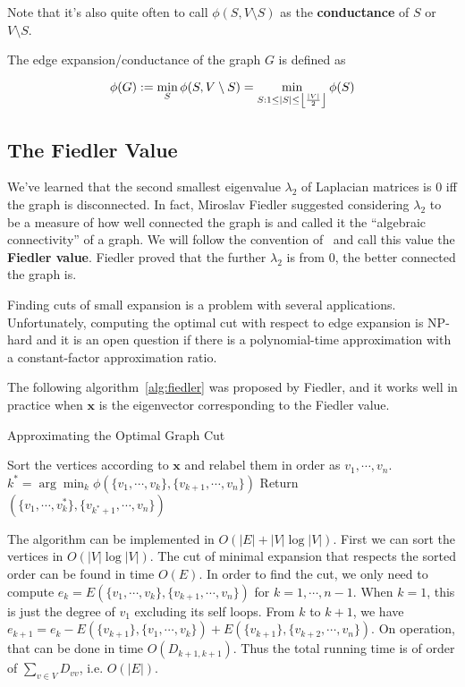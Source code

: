 \documentclass[a4paper]{article}
\DeclarePairedDelimiter\floor{\lfloor}{\rfloor}
\theoremstyle{definition}
\begin{document}
Note that it's also quite often to call $\phi(S, V\setminus S)$ as the \textbf{conductance} of $S$ or $V\setminus S$.

The edge expansion/conductance of the graph $G$ is defined as

\begin{equation}
    \phi(G) := \min_{S}\phi(S, V\setminus S) = \min_{S:1\leq |S|\leq \floor*{\frac{|V|}{2}}}\phi(S)
\end{equation}

\subsection{The Fiedler Value}

We've learned that the second smallest eigenvalue $\lambda_2$ of Laplacian matrices is $0$ iff the graph is disconnected. In fact, Miroslav Fiedler suggested considering $\lambda_2$ to be a measure of how well connected the graph is and called it the ``algebraic connectivity'' of a graph. We will follow the convention of~\cite{Spielman_notes_2018} and call this value the \textbf{Fiedler value}. Fiedler proved that the further $\lambda_2$ is from $0$, the better connected the graph is.

Finding cuts of small expansion is a problem with several applications. Unfortunately, computing the optimal cut with respect to edge expansion is NP-hard and it is an open question if there is a polynomial-time approximation with a constant-factor approximation ratio.

The following algorithm~\ref{alg:fiedler} was proposed by Fiedler, and it works well in practice when $\textbf{x}$ is the eigenvector corresponding to the Fiedler value.

\begin{algorithm}
\caption{Approximating the Optimal Graph Cut}
\begin{algorithmic}[1]

\State Sort the vertices according to $\textbf{x}$ and relabel them in order as $v_1,\cdots, v_n$.
\State $k^{\ast}=\arg\min_{k}\phi(\{v_1,\cdots, v_k\},\{v_{k+1},\cdots, v_n\})$
\State Return $(\{v_1,\cdots, v_k^{\ast}\},\{v_{k^{\ast}+1},\cdots, v_n\})$
\end{algorithmic}
\label{alg:fiedler}
\end{algorithm}

The algorithm can be implemented in $O(|E|+|V|\log |V|)$. First we can sort the vertices in $O(|V|\log |V|)$. The cut of minimal expansion that respects the sorted order can be found in time $O(E)$. In order to find the cut, we only need to compute $e_k=E(\{v_1,\cdots, v_k\},\{v_{k+1},\cdots, v_n\})$ for $k=1,\cdots, n-1$. When $k=1$, this is just the degree of $v_1$ excluding its self loops. From $k$ to $k+1$, we have $e_{k+1}=e_{k}-E(\{v_{k+1}\},\{v_1,\cdots, v_k\}) + E(\{v_{k+1}\},\{v_{k+2},\cdots, v_{n}\})$. On operation, that can be done in time $O(D_{k+1,k+1})$. Thus the total running time is of order of $\sum_{v\in V}D_{vv}$, i.e. $O(|E|)$.
\end{document}
